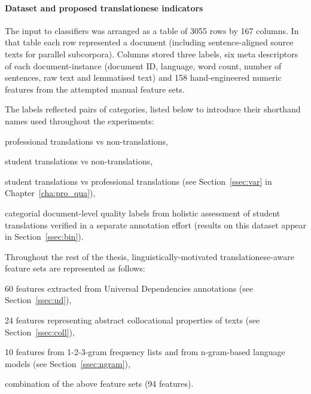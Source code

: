 \paragraph{Dataset and proposed translationese indicators} The input to classifiers was arranged as a table of 3055 rows by 167 columns. In that table each row represented a document (including sentence-aligned source texts for parallel subcorpora). Columns stored three labels, six meta descriptors of each document-instance (document ID, language, word count, number of sentences, raw text and lemmatised text) and 158 hand-engineered numeric features from the attempted manual feature sets. 

The labels reflected pairs of categories, listed below to introduce their shorthand names used throughout the experiments:

\begin{description}\compresslist{}
	\item[pro vs ref:] professional translations vs non-translations,
	\item[stu vs ref:] student translations vs non-translations,
	\item[stu vs pro:] student translations vs professional translations (see Section~\ref{ssec:var} in Chapter~\ref{cha:pro_qua}),
	\item[bad vs good:] categorial document-level quality labels from holistic assessment of student translations verified in a separate annotation effort (results on this dataset appear in Section~\ref{ssec:bin}).
\end{description}

Throughout the rest of the thesis, linguistically-motivated translationese-aware feature sets are represented as follows:
\begin{description}\compresslist{}
	\item[UD:] 60 features extracted from Universal Dependencies annotations (see Section~\ref{ssec:ud}),
	\item[collgram:] 24 features representing abstract collocational properties of texts (see Section~\ref{ssec:coll}),
	\item[ngram:] 10 features from 1-2-3-gram frequency lists and from n-gram-based language models (see Section~\ref{ssec:ngram}),
	\item[all:] combination of the above feature sets (94 features).
\end{description}  


